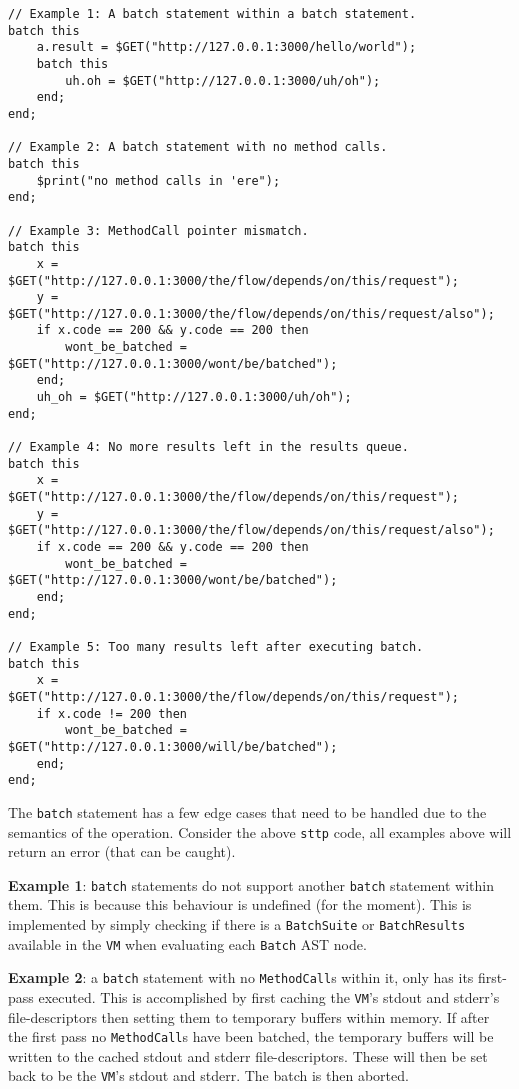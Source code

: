 \begin{verbatim}
// Example 1: A batch statement within a batch statement.
batch this
    a.result = $GET("http://127.0.0.1:3000/hello/world");
    batch this
        uh.oh = $GET("http://127.0.0.1:3000/uh/oh");
    end;
end;

// Example 2: A batch statement with no method calls.
batch this
    $print("no method calls in 'ere");
end;

// Example 3: MethodCall pointer mismatch.
batch this
    x = $GET("http://127.0.0.1:3000/the/flow/depends/on/this/request");
    y = $GET("http://127.0.0.1:3000/the/flow/depends/on/this/request/also");
    if x.code == 200 && y.code == 200 then
        wont_be_batched = $GET("http://127.0.0.1:3000/wont/be/batched");
    end;
    uh_oh = $GET("http://127.0.0.1:3000/uh/oh");
end;

// Example 4: No more results left in the results queue.
batch this
    x = $GET("http://127.0.0.1:3000/the/flow/depends/on/this/request");
    y = $GET("http://127.0.0.1:3000/the/flow/depends/on/this/request/also");
    if x.code == 200 && y.code == 200 then
        wont_be_batched = $GET("http://127.0.0.1:3000/wont/be/batched");
    end;
end;

// Example 5: Too many results left after executing batch.
batch this
    x = $GET("http://127.0.0.1:3000/the/flow/depends/on/this/request");
    if x.code != 200 then
        wont_be_batched = $GET("http://127.0.0.1:3000/will/be/batched");
    end;
end;
\end{verbatim}

The \verb|batch| statement has a few edge cases that need to be handled due to the semantics of the operation. Consider the above \verb|sttp| code, all examples above will return an error (that can be caught).

\textbf{Example 1}: \verb|batch| statements do not support another \verb|batch| statement within them. This is because this behaviour is undefined (for the moment). This is implemented by simply checking if there is a \verb|BatchSuite| or \verb|BatchResults| available in the \verb|VM| when evaluating each \verb|Batch| AST node.

\textbf{Example 2}: a \verb|batch| statement with no \verb|MethodCall|s within it, only has its first-pass executed. This is accomplished by first caching the \verb|VM|'s stdout and stderr's file-descriptors then setting them to temporary buffers within memory. If after the first pass no \verb|MethodCall|s have been batched, the temporary buffers will be written to the cached stdout and stderr file-descriptors. These will then be set back to be the \verb|VM|'s stdout and stderr. The batch is then aborted.

